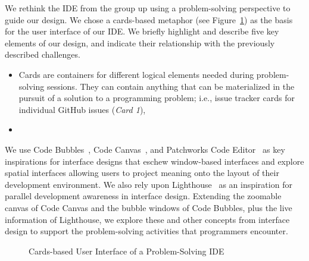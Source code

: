 We rethink the IDE from the group up using a problem-solving perspective to guide our design.
We chose a cards-based metaphor (see Figure~\ref{mockup}) as the basis for the user interface of our IDE.
We briefly highlight and describe five key elements of our design, and indicate their relationship with the previously described challenges.

\begin{itemize}
	\item Cards are containers for different logical elements needed during problem-solving sessions.
	They can contain anything that can be materialized in the pursuit of a solution to a programming problem; i.e., issue tracker cards for individual GitHub issues (\textit{Card 1}), 
	\item 
\end{itemize}

We use Code Bubbles~\cite{bragdon2010bubbles}, Code Canvas~\cite{deline2010canvas}, and Patchworks Code Editor~\cite{henley2014patchworks} as key inspirations for interface designs that eschew window-based interfaces and explore spatial interfaces allowing users to project meaning onto the layout of their development environment.
We also rely upon Lighthouse~\cite{dasilva2006lighthouse} as an inspiration for parallel development awareness in interface design.
Extending the zoomable canvas of Code Canvas and the bubble windows of Code Bubbles, plus the live information of Lighthouse, we explore these and other concepts from interface design to support the problem-solving activities that programmers encounter.

\vspace*{-0.3\baselineskip}
\begin{figure}[h!]
	\caption{Cards-based User Interface of a Problem-Solving IDE}
	\label{mockup}
    \centering
	\vspace*{-0.4\baselineskip}
\end{figure}

